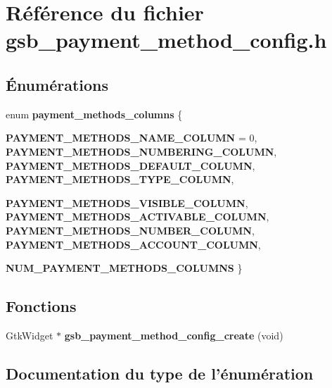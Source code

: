 \section{Référence du fichier gsb\_\-payment\_\-method\_\-config.h}
\label{gsb__payment__method__config_8h}
\subsection*{Énumérations}
\begin{DoxyCompactItemize}
\item 
enum {\bf payment\_\-methods\_\-columns} \{ \par
{\bf PAYMENT\_\-METHODS\_\-NAME\_\-COLUMN} =  0, 
{\bf PAYMENT\_\-METHODS\_\-NUMBERING\_\-COLUMN}, 
{\bf PAYMENT\_\-METHODS\_\-DEFAULT\_\-COLUMN}, 
{\bf PAYMENT\_\-METHODS\_\-TYPE\_\-COLUMN}, 
\par
{\bf PAYMENT\_\-METHODS\_\-VISIBLE\_\-COLUMN}, 
{\bf PAYMENT\_\-METHODS\_\-ACTIVABLE\_\-COLUMN}, 
{\bf PAYMENT\_\-METHODS\_\-NUMBER\_\-COLUMN}, 
{\bf PAYMENT\_\-METHODS\_\-ACCOUNT\_\-COLUMN}, 
\par
{\bf NUM\_\-PAYMENT\_\-METHODS\_\-COLUMNS}
 \}
\end{DoxyCompactItemize}
\subsection*{Fonctions}
\begin{DoxyCompactItemize}
\item 
GtkWidget $\ast$ {\bf gsb\_\-payment\_\-method\_\-config\_\-create} (void)
\end{DoxyCompactItemize}


\subsection{Documentation du type de l'énumération}
